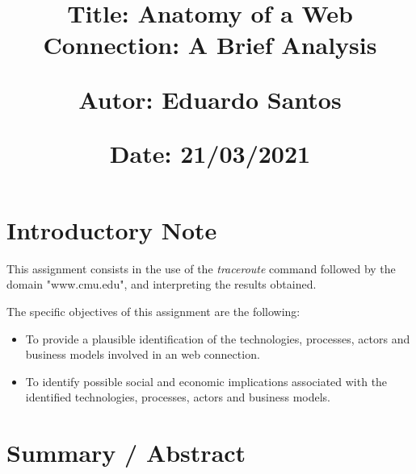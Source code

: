 \documentclass{article}
\newcommand\tab[1][1cm]{\hspace*{#1}}
\begin{document}
\title{\vspace{-0.9cm}
       \vspace{1cm}
       \normalsize
       \raggedright\textbf{Title: \hspace{1.5cm} Anatomy of a Web Connection: A Brief Analysis} \\ \vspace{0.4cm}
       \raggedright\textbf{Autor: \hspace{1.3cm} Eduardo Santos} \\ \vspace{0.4cm}
       \raggedright\textbf{Date: \hspace{1.45cm} 21/03/2021} \\}
\author{}
\date{}

\maketitle
\thispagestyle{fancy}


\vspace{-1.4cm}

\tableofcontents


\fontsize{10pt}{13pt}
\selectfont
\lsstyle


\section{Introductory Note}

\tab This assignment consists in the use of the \textit{traceroute} command followed by the domain "www.cmu.edu", and interpreting the results obtained.  

\noindent The specific objectives of this assignment are the following:

\begin{itemize}
    \item To provide a plausible identification of the technologies, processes, actors and business models involved in an web connection.
    \item To identify possible social and economic implications associated with the identified technologies, processes, actors and business models.
\end{itemize}

\section{Summary / Abstract}
\end{document}
